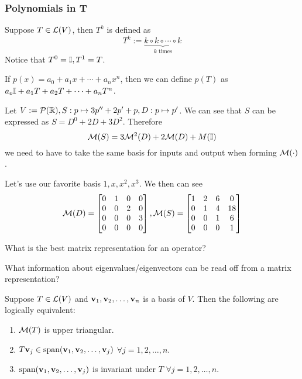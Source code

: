 \subsubsection{Polynomials in T}
\begin{definition}
    Suppose $T \in \mathcal L(V)$, then $T^k$ is defined as
    \[ T^k := \underbrace{k \circ k \circ \cdots \circ k}_{k \text{ times}}\]
    Notice that $T^0 = \mathbb I, T^1 = T$.
\end{definition}
\begin{definition}
    If $p(x) = a_0 + a_1x + \cdots + a_nx^n$, then we can define $p(T)$ as $a_o\mathbb I + a_1T + a_2T + \cdots + a_nT^n$.
\end{definition}
\begin{example}
    Let $V := \mathcal P(\mathbb R), S: p \mapsto 3p'' +  2p' + p, D: p \mapsto p'$. We can see that $S$ can be expressed as $S = D^0 + 2D + 3D^2$. Therefore \[\mathcal M(S) = 3\mathcal M^2(D) + 2\mathcal M(D) + M(\mathbb I)\] we need to have to take the same basis for inputs and output when forming $\mathcal M(\cdot)$.  
    
    \noindent Let's use our favorite basis $1,x,x^2, x^3$. We then can see
    \[ \mathcal M(D) = \begin{bmatrix} 0 & 1 & 0 & 0 \\ 0 & 0 & 2 & 0 \\ 0 & 0 & 0 & 3 \\ 0 & 0 & 0 & 0 \end{bmatrix}, \mathcal M(S) = \begin{bmatrix} 1 & 2 & 6 & 0\\ 0 & 1 & 4 & 18\\ 0 & 0 & 1 & 6 \\ 0 & 0 & 0 & 1 \end{bmatrix}\]
\end{example}
\begin{question}
    What is the best matrix representation for an operator?
\end{question}
\begin{question}
    What information about eigenvalues/eigenvectors can be read off from a matrix representation?
\end{question}
\begin{theorem}
    Suppose $T \in \mathcal L(V)$ and ${\mathbf v}_1,{\mathbf v}_2, \ldots, {\mathbf v}_{n}$ is a basis of $V$. Then the following are logically equivalent:
    \begin{enumerate}
        \item  $\mathcal M(T)$ is upper triangular.
        \item $T\mathbf v_j \in \text{span} ({\mathbf v}_1,{\mathbf v}_2, \ldots, {\mathbf v}_{j})$ $\forall j = 1,2, \ldots, n$.
        \item $\text{span} ({\mathbf v}_1,{\mathbf v}_2, \ldots, {\mathbf v}_{j})$ is invariant under $T$ $\forall j = 1,2,\ldots, n$.
    \end{enumerate}
\end{theorem}
